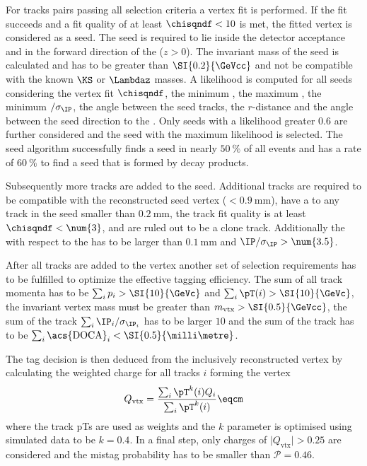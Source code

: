 For tracks pairs passing all selection criteria a vertex fit is performed. If
the fit succeeds and a fit quality of at least $\chisqndf<10$ is met, the fitted
vertex is considered as a seed. The seed is required to lie inside the detector
acceptance and in the forward direction of the \PV ($z>0$).  The invariant mass of the seed is calculated and has to be greater
than $\SI{0.2}{\GeVcc}$ and not be compatible with the known $\KS$ or $\Lambdaz$
masses. %
A likelihood is computed for all seeds considering the vertex fit $\chisqndf$,
the minimum \pT, the maximum \PV \IP, the minimum \PV \IP$/\sigma_\text{\IP}$,
the angle between the seed tracks, the $r$-distance and the angle between the
seed direction \wrt to the \PV. Only seeds with a likelihood greater $\num{0.6}$
are further considered and the seed with the maximum likelihood is selected. The
seed algorithm successfully finds a seed in nearly $\SI{50}{\percent}$ of all
events and has a rate of $\SI{60}{\percent}$ to find a seed that is formed by
\bhadron decay products.

Subsequently more tracks are added to the seed. Additional tracks are required
to be compatible with the reconstructed seed vertex
(\IP$<\SI{0.9}{\milli\metre}$), have a \DOCA to any track in the seed smaller
than $\SI{0.2}{\milli\metre}$, the track fit quality is at least
$\chisqndf<\num{3}$, and are ruled out to be a clone track. Additionally the \IP
with respect to the \PV has to be larger than $\SI{0.1}{\milli\metre}$ and
$\text{\IP}/\sigma_\text{\IP}>\num{3.5}$.

After all tracks are added to the vertex another set of selection requirements
has to be fulfilled to optimize the effective tagging efficiency. The sum of all
track momenta has to be $\sum_i p_i > \SI{10}{\GeVc}$ and $\sum_i \pT(i) >
\SI{10}{\GeVc}$, the invariant vertex mass must be greater than $m_\text{vtx} >
\SI{0.5}{\GeVcc}$, the sum of the track
$\sum_i\text{\IP}_i/\sigma_{\text{\IP}_i}$ has to be larger $\num{10}$ and the
sum of the track \DOCA has to be $\sum_i\text{\acs{DOCA}}_i <
\SI{0.5}{\milli\metre}$.

The tag decision is then deduced from the inclusively reconstructed vertex by
calculating the weighted charge for all tracks $i$ forming the vertex
%
\begin{equation}\label{eq:flavour_tagging:os:vertex:charge}
  Q_\text{vtx} = \frac{\sum_i \pT^k(i)Q_i}{\sum_i\pT^k(i)}\eqcm
\end{equation}
where the track \acp{pT} are used as weights and the $k$ parameter is optimised
using simulated data to be $k=\num{0.4}$. In a final step, only charges of
$\vert Q_\text{vtx} \vert > 0.25$ are considered and the mistag probability has
to be smaller than $\mathcal{P}=0.46$.

